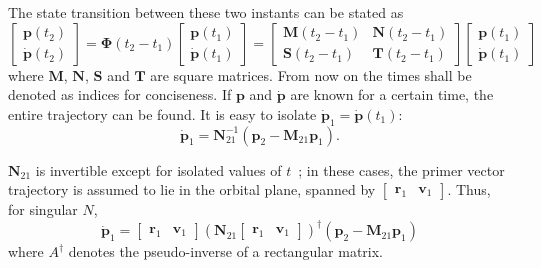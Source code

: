 The state transition between these two instants can be stated as
\begin{equation}
    \begin{bmatrix}
        \mathbf{p}(t_2) \\ \dot{\mathbf{p}}(t_2)
    \end{bmatrix} = \mathbf{\Phi}(t_2 - t_1) \begin{bmatrix}
        \mathbf{p}(t_1) \\ \dot{\mathbf{p}}(t_1)
    \end{bmatrix} = \begin{bmatrix}
        \mathbf{M}(t_2-t_1) & \mathbf{N}(t_2-t_1) \\ \mathbf{S}(t_2-t_1) & \mathbf{T}(t_2-t_1)
    \end{bmatrix} \begin{bmatrix}
        \mathbf{p}(t_1) \\ \dot{\mathbf{p}}(t_1)
    \end{bmatrix}
\end{equation}
where \(\mathbf{M}\), \(\mathbf{N}\), \(\mathbf{S}\) and \(\mathbf{T}\) are square matrices. From now on the times shall be denoted as indices for conciseness. If \(\mathbf{p}\) and \(\dot{\mathbf{p}}\) are known for a certain time, the entire trajectory can be found. It is easy to isolate \(\dot{\mathbf{p}}_1 = \dot{\mathbf{p}}(t_1)\):
\begin{equation}
    \dot{\mathbf{p}}_1 = \mathbf{N}^{-1}_{21} \left(\mathbf{p}_2 - \mathbf{M}_{21}\mathbf{p}_1\right).
\end{equation}

\(\mathbf{N}_{21}\) is invertible except for isolated values of \(t\)~\cite{Conway_2010}; in these cases, the primer vector trajectory is assumed to lie in the orbital plane, spanned by \(\begin{bmatrix}
    \mathbf{r}_1 & \mathbf{v}_1
\end{bmatrix}\). Thus, for singular \(N\),
\begin{equation}
    \dot{\mathbf{p}}_1 = \begin{bmatrix}
        \mathbf{r}_1 & \mathbf{v}_1
    \end{bmatrix} (\mathbf{N}_{21} \begin{bmatrix}
        \mathbf{r}_1 & \mathbf{v}_1
    \end{bmatrix})^\dagger \left(\mathbf{p}_2 - \mathbf{M}_{21}\mathbf{p}_1\right)
\end{equation}
where \(A^\dagger\) denotes the pseudo-inverse of a rectangular matrix.

